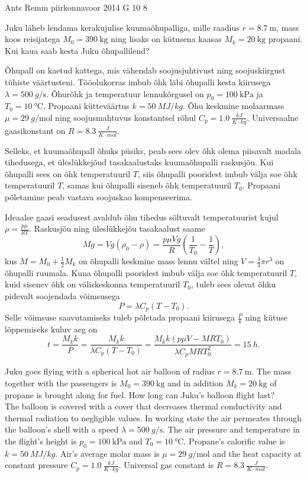 {Ants Remm} %
{piirkonnavoor} %
{2014} %
{G 10} %
{8} %
{
\ifStatement
Juku läheb lendama kerakujulise kuumaõhupalliga, mille raadius $r = \SI{8.7}{\metre}$, mass koos reisijatega $M_0= \SI{390}{\kg}$ ning lisaks on kütusena kaasas $M_k = \SI{20}{\kg}$ propaani. Kui kaua saab kesta Juku õhupallilend? 

Õhupall on kaetud kattega, mis vähendab soojusjuhtivust ning soojuskiirgust tühiste väärtusteni. Tööolukorras imbub õhk läbi õhupalli kesta kiirusega $\lambda = \SI{500}{g\per\s}$. Õhurõhk ja temperatuur lennukõrgusel on $p_0 = \SI{100}{\kilo\Pa}$ ja $T_0 = \SI{10}{\celsius}$. Propaani kütteväärtus $k = \SI{50}{MJ/kg}$. Õhu keskmine molaarmass $\mu = \SI{29}{g\per\mole}$ ning soojusmahtuvus konstantsel rõhul $C_p = \SI{1.0}{\frac{kJ}{K\cdot kg}}$. Universaalne gaasikonstant on $R = \SI{8.3}{\frac{J}{K\cdot mol}}$.
\fi


\ifHint
Selleks, et kuumaõhupall õhuks püsiks, peab sees olev õhk olema piisavalt madala tihedusega, et üleslükkejõud tasakaalustaks kuumaõhupalli raskusjõu. Kui õhupalli sees on õhk temperatuuril $T$, siis õhupalli pooridest imbub välja soe õhk temperatuuril $T$, samas kui õhupalli siseneb õhk temperatuuril $T_0$. Propaani põletamine peab vastava soojuskao kompenseerima.
\fi


\ifSolution
Ideaalse gaasi seadusest avaldub õhu tihedus sõltuvalt temperatuurist kujul $\rho = \frac{p \mu}{R T}$. Raskusjõu ning üleslükkejõu tasakaalust saame
\[
M g = V g (\rho_0 - \rho) = \frac{p \mu V g}{R} (\frac{1}{T_0} - \frac{1}{T}),
\]
kus $M = M_0 + \frac{1}{2} M_k$ on õhupalli keskmine mass lennu vältel ning $V = \frac{4}{3} \pi r^3$ on õhupalli ruumala. Kuna õhupalli pooridest imbub välja soe õhk temperatuuril $T$, kuid sisenev õhk on väliskeskonna temperatuuril $T_0$, tuleb sees olevat õhku pidevalt soojendada võimsusega
\[
P = \lambda C_p (T - T_0).
\]
Selle võimsuse saavutamiseks tuleb põletada propaani kiirusega $\frac{P}{k}$ ning kütuse lõppemiseks kuluv aeg on
\[
t = \frac{M_k k}{P} = \frac{M_k k}{\lambda C_p (T - T_0)} = \frac{M_k k (p \mu V - M R T_0)}{\lambda C_p M R T_0^2} = \SI{15}{h}.
\]
\fi


\ifEngStatement
Juku goes flying with a spherical hot air balloon of radius $r = \SI{8.7}{\metre}$. The mass together with the passengers is $M_0= \SI{390}{\kg}$ and in addition $M_k = \SI{20}{\kg}$ of propane is brought along for fuel. How long can Juku's balloon flight last?\\ 
The balloon is covered with a cover that decreases thermal conductivity and thermal radiation to negligible values. In working state the air permeates through the balloon's shell with a speed $\lambda = \SI{500}{g\per\s}$. The air pressure and temperature in the flight's height is $p_0 = \SI{100}{\kilo\Pa}$ and $T_0 = \SI{10}{\celsius}$. Propane's calorific value is $k = \SI{50}{MJ/kg}$. Air's average molar mass is $\mu = \SI{29}{g\per\mole}$ and the heat capacity at constant pressure $C_p = \SI{1.0}{\frac{kJ}{K\cdot kg}}$. Universal gas constant is $R = \SI{8.3}{\frac{J}{K\cdot mol}}$.
\fi


}
